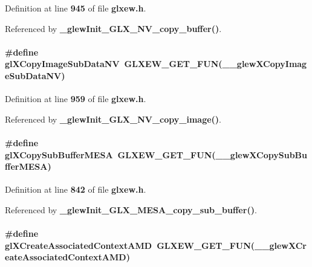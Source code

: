 Definition at line {\bf 945} of file {\bf glxew.\+h}.



Referenced by {\bf \+\_\+glew\+Init\+\_\+\+G\+L\+X\+\_\+\+N\+V\+\_\+copy\+\_\+buffer()}.

\paragraph[{gl\+X\+Copy\+Image\+Sub\+Data\+NV}]{\setlength{\rightskip}{0pt plus 5cm}\#define gl\+X\+Copy\+Image\+Sub\+Data\+NV~{\bf G\+L\+X\+E\+W\+\_\+\+G\+E\+T\+\_\+\+F\+UN}({\bf \+\_\+\+\_\+glew\+X\+Copy\+Image\+Sub\+Data\+NV})}\label{glxew_8h_a9c06548bbe02862199411737477e07bf}


Definition at line {\bf 959} of file {\bf glxew.\+h}.



Referenced by {\bf \+\_\+glew\+Init\+\_\+\+G\+L\+X\+\_\+\+N\+V\+\_\+copy\+\_\+image()}.

\paragraph[{gl\+X\+Copy\+Sub\+Buffer\+M\+E\+SA}]{\setlength{\rightskip}{0pt plus 5cm}\#define gl\+X\+Copy\+Sub\+Buffer\+M\+E\+SA~{\bf G\+L\+X\+E\+W\+\_\+\+G\+E\+T\+\_\+\+F\+UN}({\bf \+\_\+\+\_\+glew\+X\+Copy\+Sub\+Buffer\+M\+E\+SA})}\label{glxew_8h_a676e708edc08fcfebe1af5671fd4c4e0}


Definition at line {\bf 842} of file {\bf glxew.\+h}.



Referenced by {\bf \+\_\+glew\+Init\+\_\+\+G\+L\+X\+\_\+\+M\+E\+S\+A\+\_\+copy\+\_\+sub\+\_\+buffer()}.

\paragraph[{gl\+X\+Create\+Associated\+Context\+A\+MD}]{\setlength{\rightskip}{0pt plus 5cm}\#define gl\+X\+Create\+Associated\+Context\+A\+MD~{\bf G\+L\+X\+E\+W\+\_\+\+G\+E\+T\+\_\+\+F\+UN}({\bf \+\_\+\+\_\+glew\+X\+Create\+Associated\+Context\+A\+MD})}\label{glxew_8h_ab9996e51f1003035a562e0fa672bb2b9}


